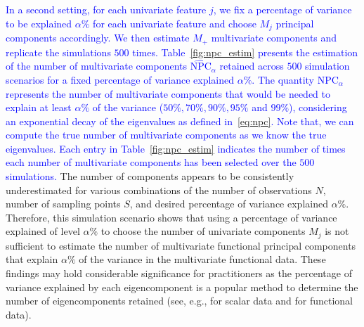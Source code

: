 \textcolor{blue}{In a second setting, for each univariate feature $j$, we fix a percentage of variance to be explained $\alpha\%$ for each univariate feature and choose $M_j$ principal components accordingly. We then estimate $M_+$ multivariate components and replicate the simulations $500$ times. Table~\ref{fig:npc_estim} presents the estimation of the number of multivariate components $\widehat{\text{NPC}}_{\alpha}$ retained across $500$ simulation scenarios for a fixed percentage of variance explained $\alpha\%$. The quantity $\text{NPC}_{\alpha}$ represents the number of multivariate components that would be needed to explain at least $\alpha\%$ of the variance ($50\%, 70\%, 90\%, 95\%$ and $99\%$), considering an exponential decay of the eigenvalues as defined in~\eqref{eq:npc}. Note that, we can compute the true number of multivariate components as we know the true eigenvalues. Each entry in Table~\ref{fig:npc_estim} indicates the number of times each number of multivariate components has been selected over the $500$ simulations.} The number of components appears to be consistently underestimated for various combinations of the number of observations $N$, number of sampling points $S$, and desired percentage of variance explained $\alpha\%$. Therefore, this simulation scenario shows that using a percentage of variance explained of level $\alpha\%$ to choose the number of univariate components $M_j$ is not sufficient to estimate the number of multivariate functional principal components that explain $\alpha\%$ of the variance in the multivariate functional data. These findings may hold considerable significance for practitioners as the percentage of variance explained by each eigencomponent is a popular method to determine the number of eigencomponents retained (see, e.g., \cite{jamesIntroductionStatisticalLearning2021} for scalar data and \cite{horvathInferenceFunctionalData2012a} for functional data).

